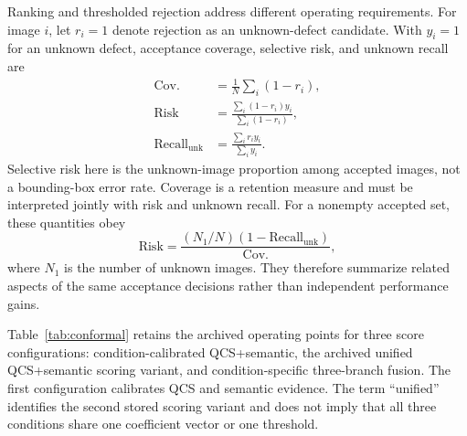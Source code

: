 Ranking and thresholded rejection address different operating requirements.
For image $i$, let $r_i=1$ denote rejection as an unknown-defect candidate.
With $y_i=1$ for an unknown defect, acceptance coverage, selective risk,
and unknown recall are
\begin{align}
  \mathrm{Cov.}&=\frac{1}{N}\sum_i(1-r_i),\\
  \mathrm{Risk}&=\frac{\sum_i(1-r_i)y_i}{\sum_i(1-r_i)},\\
  \mathrm{Recall}_{\mathrm{unk}}&=\frac{\sum_i r_i y_i}{\sum_i y_i}.
  \label{eq:exp_selective_metrics}
\end{align}
Selective risk here is the unknown-image proportion among accepted images,
not a bounding-box error rate. Coverage is a retention measure and must be
interpreted jointly with risk and unknown recall. For a nonempty accepted
set, these quantities obey
\begin{equation}
 \mathrm{Risk}=\frac{(N_1/N)(1-\mathrm{Recall}_{\mathrm{unk}})}{\mathrm{Cov.}},
 \label{eq:exp_selective_relation}
\end{equation}
where $N_1$ is the number of unknown images. They therefore summarize
related aspects of the same acceptance decisions rather than independent
performance gains.

Table~\ref{tab:conformal} retains the archived operating points for three
score configurations: condition-calibrated QCS+semantic, the archived
unified QCS+semantic scoring variant, and condition-specific three-branch
fusion. The first configuration calibrates QCS and semantic evidence.
The term ``unified'' identifies the second
stored scoring variant and does not imply that all three conditions share
one coefficient vector or one threshold.

